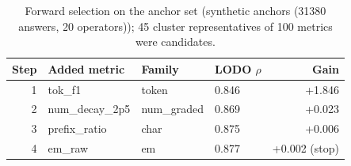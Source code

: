 \begin{table}[t]
\centering
\footnotesize
\caption{Forward selection on the anchor set (synthetic anchors (31380 answers, 20 operators)); 45 cluster representatives of 100 metrics were candidates.}
\label{tab:selected}

\begin{tabular}{rlllr}
\toprule
Step & Added metric & Family & LODO $\rho$ & Gain \\
\midrule
1 & tok\_f1 & token & 0.846 & +1.846 \\
2 & num\_decay\_2p5 & num\_graded & 0.869 & +0.023 \\
3 & prefix\_ratio & char & 0.875 & +0.006 \\
4 & em\_raw & em & 0.877 & +0.002 (stop) \\
\bottomrule
\end{tabular}

\end{table}